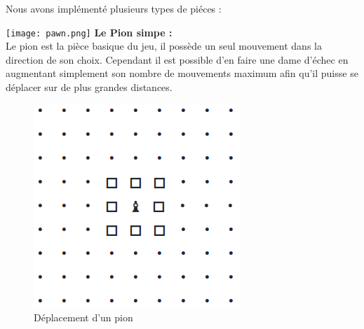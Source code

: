         \newpage
        
        \noindent Nous avons implémenté plusieurs types de piéces :
        \bigbreak

        \texttt{[image: pawn.png]} \textbf{Le Pion simpe :} \\
        Le pion est la pièce basique du jeu, il possède un seul mouvement dans la direction de son choix. Cependant il est possible d'en faire une dame d'échec en augmentant simplement son nombre de mouvements maximum afin qu'il puisse se déplacer sur de plus grandes distances.
        \medbreak
         \begin{figure}[H]
            \centering
            \includegraphics[scale=0.3]{img/dep_pawn.png}
            \caption{Déplacement d'un pion}
            \label{fig:dep_pawn}
        \end{figure}
            
